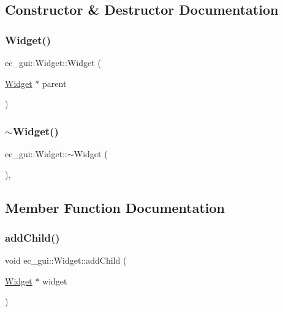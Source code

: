 \subsection{Constructor \& Destructor Documentation}
\mbox{\label{classec__gui_1_1_widget_a9371f37c8a4825bc11058c0624641575}} 
\subsubsection{\texorpdfstring{Widget()}{Widget()}}
{\footnotesize\ttfamily ec\+\_\+gui\+::\+Widget\+::\+Widget (\begin{DoxyParamCaption}\item[{\mbox{\hyperlink{classec__gui_1_1_widget}{Widget}} $\ast$}]{parent }\end{DoxyParamCaption})\hspace{0.3cm}{\ttfamily [explicit]}}

\mbox{\label{classec__gui_1_1_widget_a4e74d028fcbbb8b939f5017d3052578e}} 
\subsubsection{\texorpdfstring{$\sim$\+Widget()}{~Widget()}}
{\footnotesize\ttfamily ec\+\_\+gui\+::\+Widget\+::$\sim$\+Widget (\begin{DoxyParamCaption}{ }\end{DoxyParamCaption})\hspace{0.3cm}{\ttfamily [virtual]}, {\ttfamily [default]}}



\subsection{Member Function Documentation}
\mbox{\label{classec__gui_1_1_widget_a089877f93123b630011be58624c5d8cf}} 
\subsubsection{\texorpdfstring{add\+Child()}{addChild()}}
{\footnotesize\ttfamily void ec\+\_\+gui\+::\+Widget\+::add\+Child (\begin{DoxyParamCaption}\item[{\mbox{\hyperlink{classec__gui_1_1_widget}{Widget}} $\ast$}]{widget }\end{DoxyParamCaption})\hspace{0.3cm}{\ttfamily [virtual]}}




